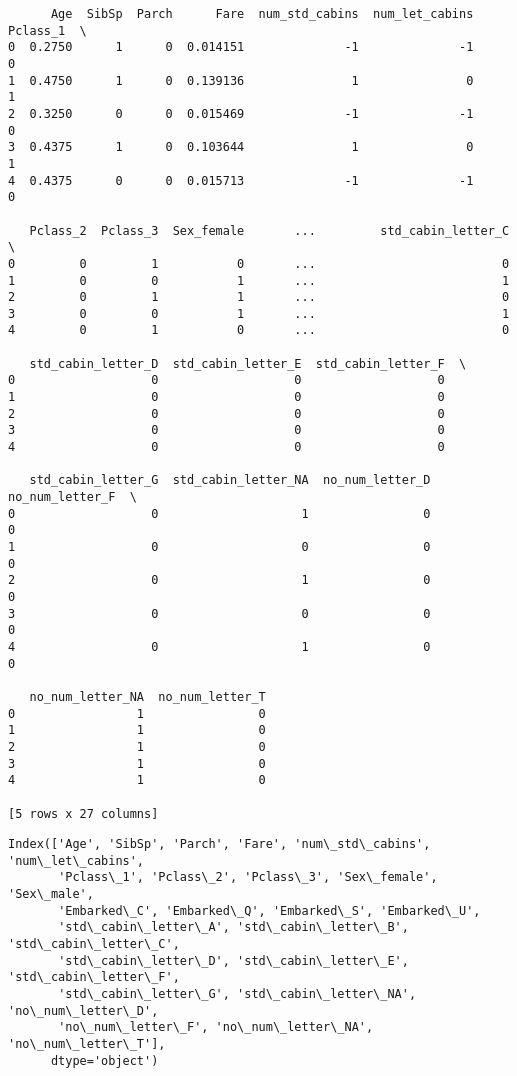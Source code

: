 \documentclass[11pt]{article}
\begin{document}
    
    \begin{verbatim}
      Age  SibSp  Parch      Fare  num_std_cabins  num_let_cabins  Pclass_1  \
0  0.2750      1      0  0.014151              -1              -1         0   
1  0.4750      1      0  0.139136               1               0         1   
2  0.3250      0      0  0.015469              -1              -1         0   
3  0.4375      1      0  0.103644               1               0         1   
4  0.4375      0      0  0.015713              -1              -1         0   

   Pclass_2  Pclass_3  Sex_female       ...         std_cabin_letter_C  \
0         0         1           0       ...                          0   
1         0         0           1       ...                          1   
2         0         1           1       ...                          0   
3         0         0           1       ...                          1   
4         0         1           0       ...                          0   

   std_cabin_letter_D  std_cabin_letter_E  std_cabin_letter_F  \
0                   0                   0                   0   
1                   0                   0                   0   
2                   0                   0                   0   
3                   0                   0                   0   
4                   0                   0                   0   

   std_cabin_letter_G  std_cabin_letter_NA  no_num_letter_D  no_num_letter_F  \
0                   0                    1                0                0   
1                   0                    0                0                0   
2                   0                    1                0                0   
3                   0                    0                0                0   
4                   0                    1                0                0   

   no_num_letter_NA  no_num_letter_T  
0                 1                0  
1                 1                0  
2                 1                0  
3                 1                0  
4                 1                0  

[5 rows x 27 columns]
    \end{verbatim}

    
    \begin{Verbatim}[commandchars=\\\{\}]
Index(['Age', 'SibSp', 'Parch', 'Fare', 'num\_std\_cabins', 'num\_let\_cabins',
       'Pclass\_1', 'Pclass\_2', 'Pclass\_3', 'Sex\_female', 'Sex\_male',
       'Embarked\_C', 'Embarked\_Q', 'Embarked\_S', 'Embarked\_U',
       'std\_cabin\_letter\_A', 'std\_cabin\_letter\_B', 'std\_cabin\_letter\_C',
       'std\_cabin\_letter\_D', 'std\_cabin\_letter\_E', 'std\_cabin\_letter\_F',
       'std\_cabin\_letter\_G', 'std\_cabin\_letter\_NA', 'no\_num\_letter\_D',
       'no\_num\_letter\_F', 'no\_num\_letter\_NA', 'no\_num\_letter\_T'],
      dtype='object')

    \end{Verbatim}
\end{document}
